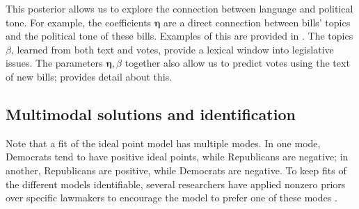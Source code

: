 This posterior allows us to explore the connection between language
and political tone.  For example, the coefficients $\bm \eta$ are a
direct connection between bills' topics and the political tone of
these bills. Examples of this are provided in .
The topics $\beta$, learned from both text and votes, provide a
lexical window into legislative issues.  The parameters $\bm \eta,
\beta$ together also allow us to predict votes using the text of new
bills;  provides detail about this.





\subsection*{Multimodal solutions and identification}
\label{sec:pv_identification}
Note that a fit of the ideal point model has multiple modes.  In one
mode, Democrats tend to have positive ideal points, while Republicans
are negative; in another, Republicans are positive, while Democrats
are negative.  To keep fits of the different models identifiable,
several researchers have applied nonzero priors over specific
lawmakers to encourage the model to prefer one of these modes
\citep{jackman:2001,clinton:2004,martin:2002}.

